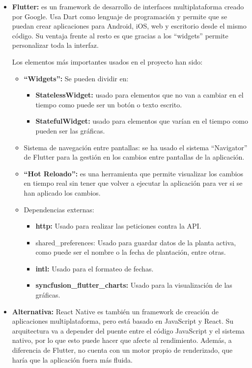 \begin{itemize}
    \item \textbf{Flutter:} es un framework de desarrollo de interfaces multiplataforma creado por Google. Usa Dart como lenguaje de programación y permite que se puedan crear aplicaciones para Android, iOS, web y escritorio desde el mismo código. Su ventaja frente al resto es que gracias a los ``widgets'' permite personalizar toda la interfaz.

    Los elementos más importantes usados en el proyecto han sido:
    \begin{itemize}
        \item \textbf{``Widgets'':} Se pueden dividir en:
        \begin{itemize}
            \item \textbf{StatelessWidget:} usado para elementos que no van a cambiar en el tiempo como puede ser un botón o texto escrito.
            \item \textbf{StatefulWidget:} usado para elementos que varían en el tiempo como pueden ser las gráficas.
        \end{itemize}

        \item {Sistema de navegación entre pantallas:} se ha usado el sistema ``Navigator'' de Flutter para la gestión en los cambios entre pantallas de la aplicación.

        \item \textbf{``Hot Reloado'':} es una herramienta que permite visualizar los cambios en tiempo real sin tener que volver a ejecutar la aplicación para ver si se han aplicado los cambios.

        \item {Dependencias externas:}
        \begin{itemize}
            \item \textbf{http:} Usado para realizar las peticiones contra la API.
            \item {shared\_preferences:} Usado para guardar datos de la planta activa, como puede ser el nombre o la fecha de plantación, entre otras.
            \item \textbf{intl:} Usado para el formateo de fechas.
            \item \textbf{syncfusion\_flutter\_charts:} Usado para la visualización de las gráficas.
        \end{itemize}
    \end{itemize}

    \item \textbf{Alternativa:} React Native es también un framework de creación de aplicaciones multiplataforma, pero está basado en JavaScript y React. Su arquitectura va a depender del puente entre el código JavaScript y el sistema nativo, por lo que esto puede hacer que afecte al rendimiento. Además, a diferencia de Flutter, no cuenta con un motor propio de renderizado, que haría que la aplicación fuera más fluida.
\end{itemize}

